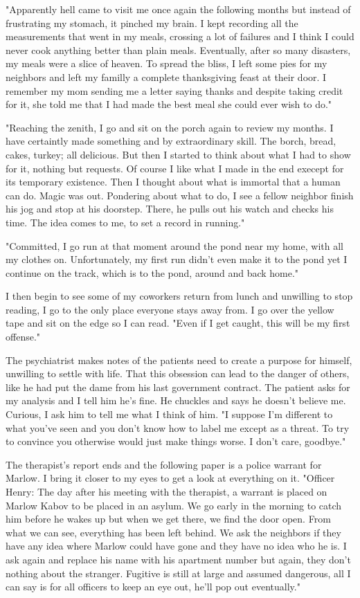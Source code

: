 		"Apparently hell came to visit me once again the following months but instead of frustrating my stomach, it pinched my brain. I kept recording all
	the measurements that went in my meals, crossing a lot of failures and I think I could never cook anything better than plain meals. Eventually, after so many disasters, my meals
	were a slice of heaven. To spread the bliss, I left some pies for my neighbors and left my familly a complete thanksgiving feast at their door. I remember
	my mom sending me a letter saying thanks and despite taking credit for it, she told me that I had made the best meal she could ever wish to do."

		"Reaching the zenith, I go and sit on the porch again to review my months. I have certaintly made something and by extraordinary skill.
	The borch, bread, cakes, turkey; all delicious. But then I started to think about what I had to show for it, nothing but requests. Of course I like what I made 
	in the end execept for its temporary existence. Then I thought about what is immortal that a human can do. Magic was out. Pondering about what to do, I see
	a fellow neighbor finish his jog and stop at his doorstep. There, he pulls out his watch and checks his time. The idea comes to me, to set a record in 
	running."

		"Committed, I go run at that moment around the pond near my home, with all my clothes on. Unfortunately, my first run didn't even make it to the pond
	yet I continue on the track, which is to the pond, around and back home."

		I then begin to see some of my coworkers return from lunch and unwilling to stop reading, I go to the only place everyone stays away from. I go over
	the yellow tape and sit on the edge so I can read. "Even if I get caught, this will be my first offense."

		The psychiatrist makes notes of the patients need to create a purpose for himself, unwilling to settle with life. That this obsession can lead to the
	danger of others, like he had put the dame from his last government contract. The patient asks for my analysis and I tell him he's fine. He chuckles and says
	he doesn't believe me. Curious, I ask him to tell me what I think of him. "I suppose I'm different to what you've seen and you don't know how to label me
	except as a threat. To try to convince you otherwise would just make things worse. I don't care, goodbye."

		The therapist's report ends and the following paper is a police warrant for Marlow. I bring it closer to my eyes to get a look at everything on it.
	"Officer Henry: The day after his meeting with the therapist, a warrant is placed on Marlow Kabov to be placed in an asylum. We go early in the morning to
	catch him before he wakes up but when we get there, we find the door open. From what we can see, everything has been left behind. We ask the neighbors if they
	have any idea where Marlow could have gone and they have no idea who he is. I ask again and replace his name with his apartment number but again, they don't
	nothing about the stranger. Fugitive is still at large and assumed dangerous, all I can say is for all officers to keep an eye out, he'll pop out eventually."

